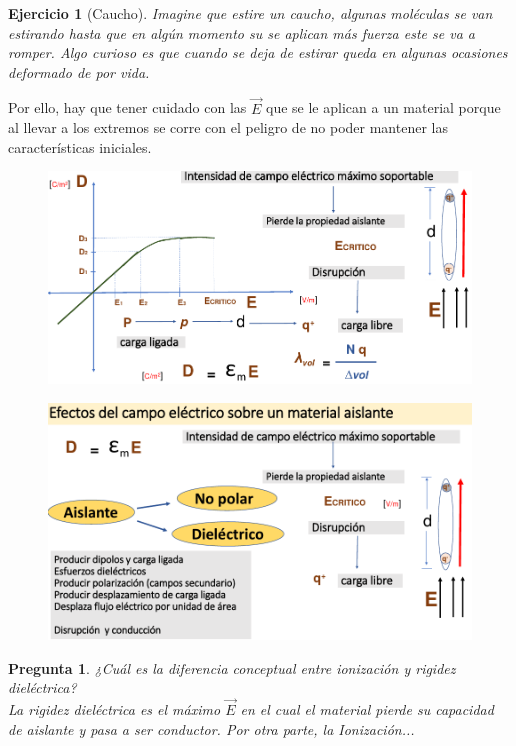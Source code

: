 \documentclass[12pt,letterpaper]{book}
\newtheorem{exercise}{Ejercicio}[section]
\newtheorem{question}{Pregunta}[section]
\begin{document}
\begin{exercise}[Caucho]
Imagine que estire un caucho, algunas moléculas se van estirando hasta que en algún momento su se aplican más fuerza este se va a romper. Algo curioso es que cuando se deja de estirar queda en algunas ocasiones deformado de por vida.
\end{exercise}

Por ello, hay que tener cuidado con las $\vec{E}$ que se le aplican a un material porque al llevar a los extremos se corre con el peligro de no poder mantener las características iniciales.

\begin{figure}[H]
\centering
\includegraphics[width=1\linewidth]{figures/dis1.png}
\caption{}
\label{}
\end{figure}
\vspace{0.2cm}

\begin{figure}[H]
\centering
\includegraphics[width=1\linewidth]{figures/dis2.png}
\caption{}
\label{}
\end{figure}
\vspace{0.2cm}

\begin{question}
¿Cuál es la diferencia conceptual entre ionización y rigidez dieléctrica?\\
La rigidez dieléctrica es el máximo $\vec{E}$ en el cual el material pierde su capacidad de aislante y pasa a ser conductor. Por otra parte, la Ionización...
\end{question}
\end{document}

